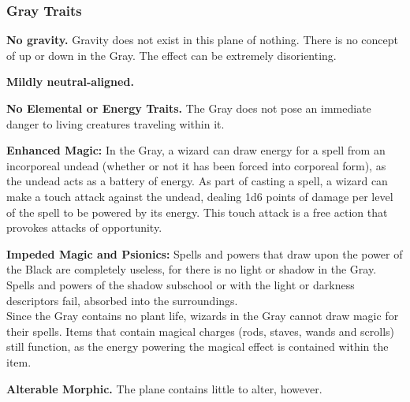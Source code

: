 \subsubsection{Gray Traits}
\begin{itemize*}
\item \textbf{No gravity.} Gravity does not exist in this plane of nothing. There is no concept of up or down in the Gray. The effect can be extremely disorienting.
\item \textbf{Mildly neutral-aligned.}
\item \textbf{No Elemental or Energy Traits.} The Gray does not pose an immediate danger to living creatures traveling within it.
\item \textbf{Enhanced Magic:} In the Gray, a wizard can draw energy for a spell from an incorporeal undead (whether or not it has been forced into corporeal form), as the undead acts as a battery of energy. As part of casting a spell, a wizard can make a touch attack against the undead, dealing 1d6 points of damage per level of the spell to be powered by its energy. This touch attack is a free action that provokes attacks of opportunity.
\item \textbf{Impeded Magic and Psionics:} Spells and powers that draw upon the power of the Black are completely useless, for there is no light or shadow in the Gray. Spells and powers of the shadow subschool or with the light or darkness descriptors fail, absorbed into the surroundings.\\

Since the Gray contains no plant life, wizards in the Gray cannot draw magic for their spells. Items that contain magical charges (rods, staves, wands and scrolls) still function, as the energy powering the magical effect is contained within the item.
\item \textbf{Alterable Morphic.} The plane contains little to alter, however.
\end{itemize*}



